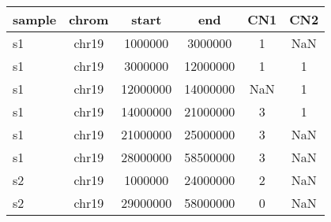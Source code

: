 \documentclass{standalone}
\begin{document}
\begin{tabular}{|l|c|c|c|c|c|}
\toprule
sample & chrom & start & end & CN1 & CN2 \\
\midrule
s1 & chr19 & 1000000 & 3000000 & 1 & NaN \\
s1 & chr19 & 3000000 & 12000000 & 1 & 1 \\
s1 & chr19 & 12000000 & 14000000 & NaN & 1 \\
s1 & chr19 & 14000000 & 21000000 & 3 & 1 \\
s1 & chr19 & 21000000 & 25000000 & 3 & NaN \\
s1 & chr19 & 28000000 & 58500000 & 3 & NaN \\
s2 & chr19 & 1000000 & 24000000 & 2 & NaN \\
s2 & chr19 & 29000000 & 58000000 & 0 & NaN \\
\bottomrule
\end{tabular}
\end{document}
